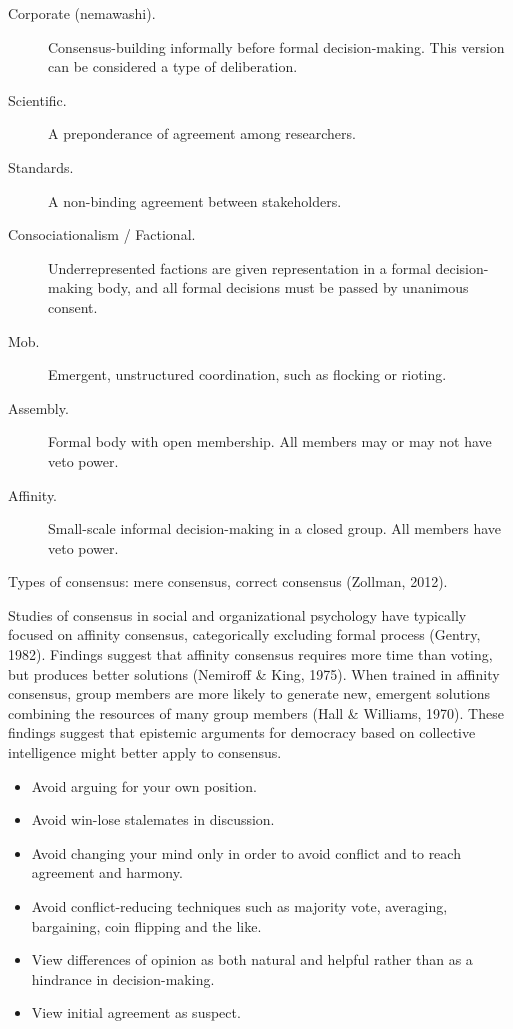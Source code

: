\begin{description}
\item[Corporate (nemawashi).]{Consensus-building informally before formal decision-making. This version can be considered a type of deliberation.}
\item[Scientific.]{A preponderance of agreement among researchers.}
\item[Standards.]{A non-binding agreement between stakeholders.}
\item[Consociationalism / Factional.]{Underrepresented factions are given representation in a formal decision-making body, and all formal decisions must be passed by unanimous consent.}
\item[Mob.]{Emergent, unstructured coordination, such as flocking or rioting.}
\item[Assembly.]{Formal body with open membership. All members may or may not have veto power.}
\item[Affinity.]{Small-scale informal decision-making in a closed group. All members have veto power.}
\end{description}

Types of consensus: mere consensus, correct consensus (Zollman, 2012).

Studies of consensus in social and organizational psychology have typically focused on affinity consensus, categorically excluding formal process (Gentry, 1982). Findings suggest that affinity consensus requires more time than voting, but produces better solutions (Nemiroff \& King, 1975). When trained in affinity consensus, group members are more likely to generate new, emergent solutions combining the resources of many group members (Hall \& Williams, 1970). These findings suggest that epistemic arguments for democracy based on collective intelligence might better apply to consensus.
\begin{itemize}
\item{Avoid arguing for your own position.}
\item{Avoid win-lose stalemates in discussion.}
\item{Avoid changing your mind only in order to avoid conflict and to reach agreement and harmony.}
\item{Avoid conflict-reducing techniques such as majority vote, averaging, bargaining, coin flipping and the like.}
\item{View differences of opinion as both natural and helpful rather than as a hindrance in decision-making.}
\item{View initial agreement as suspect.}
\end{itemize}

